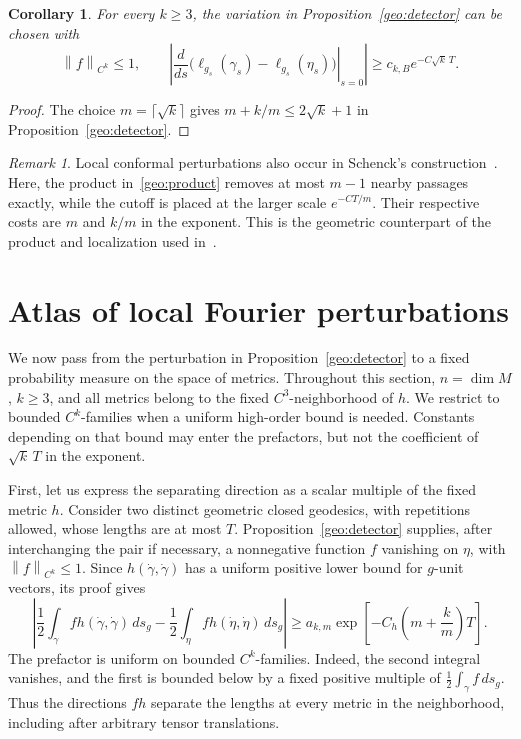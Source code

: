 \documentclass[10pt,oneside,reqno]{amsproc}
\numberwithin{equation}{section}
\newtheorem{corollary}[theorem]{Corollary}
\theoremstyle{definition}
\theoremstyle{remark}
\newtheorem{remark}[theorem]{Remark}
\newcommand{\norm}[1]{\left\|#1\right\|}
\renewcommand{\ge}{\geqslant}
\renewcommand{\le}{\leqslant}
\begin{document}
\begin{corollary}
\label{geo:sqrt}
For every $k\ge3$, the variation in Proposition~\ref{geo:detector} can be chosen with
\[
 \norm{f}_{C^k}\le1,\qquad \left|\left.\frac{d}{ds}\bigl(\ell_{g_s}(\gamma_s)-\ell_{g_s}(\eta_s)\bigr)\right|_{s=0}\right|\ge c_{k,B}e^{-C\sqrt{k}\,T}.
\]
\end{corollary}

\begin{proof}
The choice $m=\lceil\sqrt{k}\rceil$ gives $m+k/m\le2\sqrt{k}+1$ in Proposition~\ref{geo:detector}.
\end{proof}

\begin{remark}
Local conformal perturbations also occur in Schenck's construction~\cite{Schenck}. Here, the product in~\eqref{geo:product} removes at most $m-1$ nearby passages exactly, while the cutoff is placed at the larger scale $e^{-CT/m}$. Their respective costs are $m$ and $k/m$ in the exponent. This is the geometric counterpart of the product and localization used in~\cite[Appendix~A, proof of Proposition~A.3]{DK}.
\end{remark}

\section{Atlas of local Fourier perturbations}
\label{prob:section}

We now pass from the perturbation in Proposition~\ref{geo:detector} to a fixed probability measure on the space of metrics. Throughout this section, $n=\dim M$, $k\ge3$, and all metrics belong to the fixed $C^3$-neighborhood of $h$. We restrict to bounded $C^k$-families when a uniform high-order bound is needed. Constants depending on that bound may enter the prefactors, but not the coefficient of $\sqrt{k}\,T$ in the exponent.

First, let us express the separating direction as a scalar multiple of the fixed metric $h$. Consider two distinct geometric closed geodesics, with repetitions allowed, whose lengths are at most $T$. Proposition~\ref{geo:detector} supplies, after interchanging the pair if necessary, a nonnegative function $f$ vanishing on $\eta$, with $\norm{f}_{C^k}\le1$. Since $h(\dot\gamma,\dot\gamma)$ has a uniform positive lower bound for $g$-unit vectors, its proof gives
\begin{equation}
 \left|\frac12\int_\gamma f h(\dot\gamma,\dot\gamma)\,ds_g-\frac12\int_\eta f h(\dot\eta,\dot\eta)\,ds_g\right|\ge a_{k,m}\exp\left[-C_h\left(m+\frac{k}{m}\right)T\right].
 \label{prob:detector}
\end{equation}
The prefactor is uniform on bounded $C^k$-families. Indeed, the second integral vanishes, and the first is bounded below by a fixed positive multiple of $\frac12\int_\gamma f\,ds_g$. Thus the directions $fh$ separate the lengths at every metric in the neighborhood, including after arbitrary tensor translations.
\end{document}
